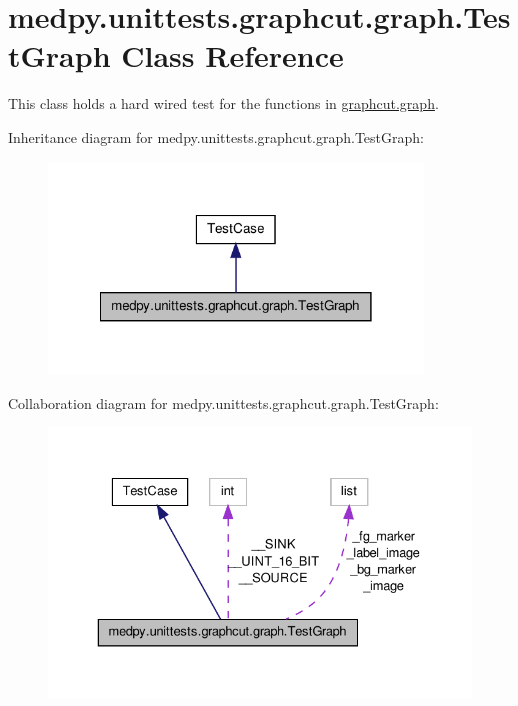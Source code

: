 \hypertarget{classmedpy_1_1unittests_1_1graphcut_1_1graph_1_1TestGraph}{
\section{medpy.unittests.graphcut.graph.TestGraph Class Reference}
\label{classmedpy_1_1unittests_1_1graphcut_1_1graph_1_1TestGraph}
}


This class holds a hard wired test for the functions in \hyperlink{namespacemedpy_1_1graphcut_1_1graph}{graphcut.graph}.  




Inheritance diagram for medpy.unittests.graphcut.graph.TestGraph:\nopagebreak
\begin{figure}[H]
\begin{center}
\leavevmode
\includegraphics[width=282pt]{classmedpy_1_1unittests_1_1graphcut_1_1graph_1_1TestGraph__inherit__graph}
\end{center}
\end{figure}


Collaboration diagram for medpy.unittests.graphcut.graph.TestGraph:\nopagebreak
\begin{figure}[H]
\begin{center}
\leavevmode
\includegraphics[width=332pt]{classmedpy_1_1unittests_1_1graphcut_1_1graph_1_1TestGraph__coll__graph}
\end{center}
\end{figure}
